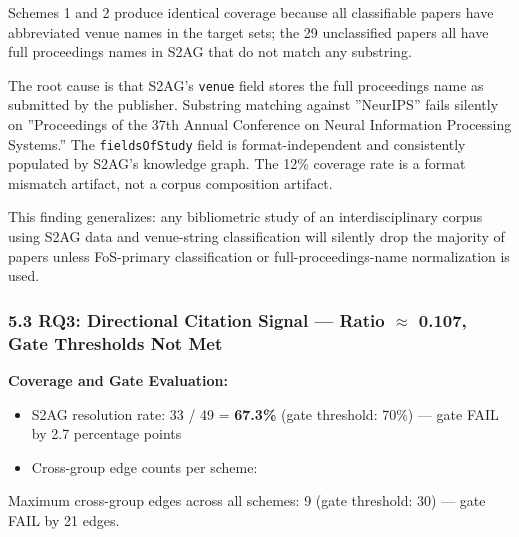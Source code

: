 Schemes 1 and 2 produce identical coverage because all classifiable papers have abbreviated venue names in the target sets; the 29 unclassified papers all have full proceedings names in S2AG that do not match any substring.

The root cause is that S2AG's \texttt{venue} field stores the full proceedings name as submitted by the publisher. Substring matching against ''NeurIPS'' fails silently on ''Proceedings of the 37th Annual Conference on Neural Information Processing Systems.'' The \texttt{fieldsOfStudy} field is format-independent and consistently populated by S2AG's knowledge graph. The 12\% coverage rate is a format mismatch artifact, not a corpus composition artifact.

This finding generalizes: any bibliometric study of an interdisciplinary corpus using S2AG data and venue-string classification will silently drop the majority of papers unless FoS-primary classification or full-proceedings-name normalization is used.

\subsubsection{5.3 RQ3: Directional Citation Signal --- Ratio $\approx$ 0.107, Gate Thresholds Not Met}

\textbf{Coverage and Gate Evaluation:}

\begin{itemize}
\item S2AG resolution rate: 33 / 49 = \textbf{67.3\%} (gate threshold: 70\%) --- gate FAIL by 2.7 percentage points
\item Cross-group edge counts per scheme:
\end{itemize}

\begin{table}[htbp]
\centering
{}
\end{table}

Maximum cross-group edges across all schemes: 9 (gate threshold: 30) --- gate FAIL by 21 edges.

